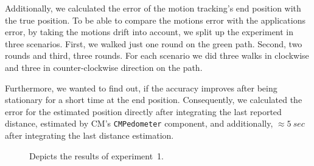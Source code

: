 Additionally, we calculated the error of the motion tracking's end position with the true position. To be able to compare the motions error with the applications error, by taking the motions drift into account, we split up the experiment in three scenarios. First, we walked just one round on the green path. Second, two rounds and third, three rounds. For each scenario we did three walks in clockwise and three in counter-clockwise direction on the path.

Furthermore, we wanted to find out, if the accuracy improves after being stationary for a short time at the end position. Consequently, we calculated the error for the estimated position directly after integrating the last reported distance, estimated by \ac{CM}'s \texttt{CMPedometer} component, and additionally, $\approx 5~sec$ after integrating the last distance estimation.


\begin{figure}


\caption{Depicts the results of experiment~1.}
\label{fig:exp1_results}
\end{figure}

